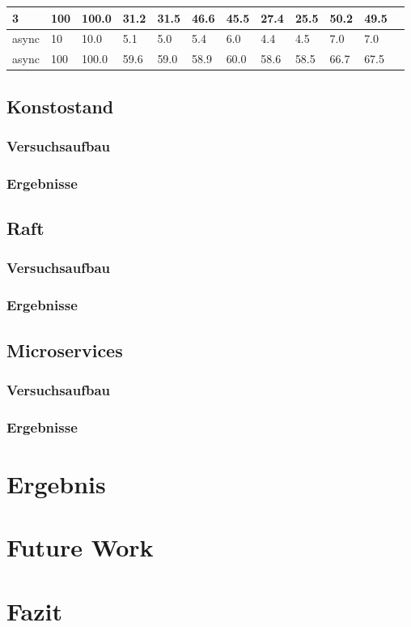 \documentclass[a4paper]{report}
\begin{document}
\begin{table}[h]
\begin{tabular}{|l|l|l|l|l|l|l|l|l|l|l|l|}
		3                        & 100                                & 100.0                           & 31.2                        & 31.5                      & 46.6                           & 45.5   & 27.4 & 25.5   & 50.2 & 49.5   \\ \hline
		async                    & 10                                 & 10.0                            & 5.1                         & 5.0                       & 5.4                            & 6.0    & 4.4  & 4.5    & 7.0  & 7.0    \\ \hline
		async                    & 100                                & 100.0                           & 59.6                        & 59.0                      & 58.9                           & 60.0   & 58.6 & 58.5   & 66.7 & 67.5   \\ \hline
	\end{tabular}
\end{table}


\section{Konstostand}
\subsection{Versuchsaufbau}
\subsection{Ergebnisse}
\section{Raft}
\subsection{Versuchsaufbau}
\subsection{Ergebnisse}
\section{Microservices}
\subsection{Versuchsaufbau}
\subsection{Ergebnisse}

\chapter{Ergebnis}

\chapter{Future Work}

\chapter{Fazit}

\printbibliography
\end{document}
